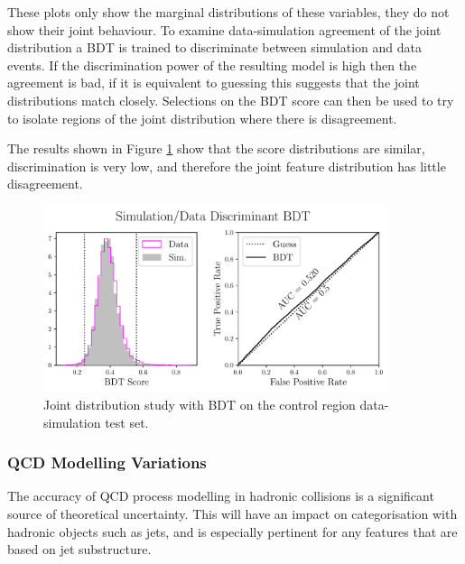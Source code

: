 These plots only show the marginal distributions of these variables, they do not show their joint behaviour. 
To examine data-simulation agreement of the joint distribution a BDT is trained to discriminate between simulation and data events. 
If the discrimination power of the resulting model is high then the agreement is bad, if it is equivalent to guessing this suggests that the joint distributions match closely. 
Selections on the BDT score can then be used to try to isolate regions of the joint distribution where there is disagreement. 

The results shown in Figure \ref{fig:event_categorisation:zee_bdt_validation} show that the score distributions are similar, discrimination is very low, and therefore the joint feature distribution has little disagreement.
\begin{figure}[h!]
    \begin{center}
    \includegraphics[width=0.9\textwidth]{figures/event_selection/eng_feature_ROC_Zee_BDT.pdf}
    \end{center}
    \caption{Joint distribution study with BDT on the \Zee control region data-simulation test set.}
    \label{fig:event_categorisation:zee_bdt_validation}
\end{figure}


\subsubsection{QCD Modelling Variations}
\label{chap:event_select:vbf_bdt:ueps_variants}
The accuracy of QCD process modelling in hadronic collisions is a significant source of theoretical uncertainty. 
This will have an impact on categorisation with hadronic objects such as jets, and is especially pertinent for any features that are based on jet substructure. 

